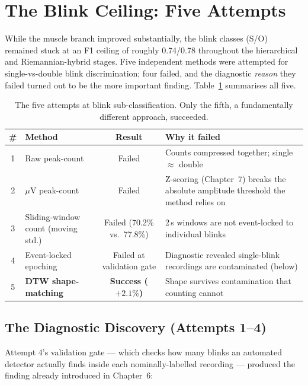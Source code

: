 \section{The Blink Ceiling: Five Attempts}
\label{sec:cl_dtw}

While the muscle branch improved substantially, the blink classes
(S/O) remained stuck at an F1 ceiling of roughly 0.74/0.78
throughout the hierarchical and Riemannian-hybrid stages. Five
independent methods were attempted for single-vs-double blink
discrimination; four failed, and the diagnostic \emph{reason} they
failed turned out to be the more important finding.
Table~\ref{tab:blink_attempts} summarises all five.

\begin{table}[htbp]
\centering
\caption{The five attempts at blink sub-classification. Only the
fifth, a fundamentally different approach, succeeded.}
\label{tab:blink_attempts}
\renewcommand{\arraystretch}{1.3}
\begin{tabular}{c p{3.2cm} c p{5.0cm}}
\toprule
\textbf{\#} & \textbf{Method} & \textbf{Result} &
\textbf{Why it failed} \\
\midrule
1 & Raw peak-count & Failed & Counts compressed together;
    single $\approx$ double \\
2 & $\mu$V peak-count & Failed & Z-scoring (Chapter~7) breaks the
    absolute amplitude threshold the method relies on \\
3 & Sliding-window count (moving std.) & Failed (70.2\% vs.\
    77.8\%) & 2\,s windows are not event-locked to individual
    blinks \\
4 & Event-locked epoching & Failed at validation gate & Diagnostic
    revealed single-blink recordings are contaminated
    (below) \\
5 & \textbf{DTW shape-matching} & \textbf{Success ($+2.1\%$)} &
    Shape survives contamination that counting cannot \\
\bottomrule
\end{tabular}
\end{table}

\subsection{The Diagnostic Discovery (Attempts 1--4)}

Attempt 4's validation gate --- which checks how many blinks an
automated detector actually finds inside each nominally-labelled
recording --- produced the finding already introduced in Chapter~6:


